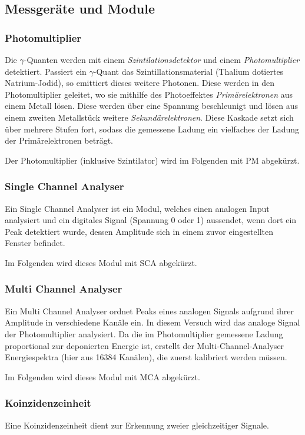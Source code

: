 \documentclass{../Misc/MontavonLaTeX/Montavon}
\begin{document}
\subsection{Messgeräte und Module}
\subsubsection{Photomultiplier}
Die $\gamma$-Quanten werden mit einem \emph{Szintilationsdetektor} und einem \emph{Photomultiplier} detektiert. Passiert ein $\gamma$-Quant das Szintillationsmaterial (Thalium dotiertes Natrium-Jodid), so emittiert dieses weitere Photonen. Diese werden in den Photomultiplier geleitet, wo sie mithilfe des Photoeffektes \emph{Primärelektronen} aus einem Metall lösen. Diese werden über eine Spannung beschleunigt und lösen aus einem zweiten Metallstück weitere \emph{Sekundärelektronen}. Diese Kaskade setzt sich über mehrere Stufen fort, sodass die gemessene Ladung ein vielfaches der Ladung der Primärelektronen beträgt.

Der Photomultiplier (inklusive Szintilator) wird im Folgenden mit PM abgekürzt.

\subsubsection{Single Channel Analyser}
Ein Single Channel Analyser ist ein Modul, welches einen analogen Input analysiert und ein digitales Signal (Spannung 0 oder 1) aussendet, wenn dort ein Peak detektiert wurde, dessen Amplitude sich in einem zuvor eingestellten Fenster befindet.

Im Folgenden wird dieses Modul mit SCA abgekürzt. 

\subsubsection{Multi Channel Analyser}
Ein Multi Channel Analyser ordnet Peaks eines analogen Signals aufgrund ihrer Amplitude in verschiedene Kanäle ein. In diesem Versuch wird das analoge Signal der Photomultiplier analysiert. Da die im Photomultiplier gemessene Ladung proportional zur deponierten Energie ist, erstellt der Multi-Channel-Analyser Energiespektra (hier aus 16384 Kanälen), die zuerst kalibriert werden müssen. 

Im Folgenden wird dieses Modul mit MCA abgekürzt. 

\subsubsection{Koinzidenzeinheit}
Eine Koinzidenzeinheit dient zur Erkennung zweier gleichzeitiger Signale. 
\end{document}

